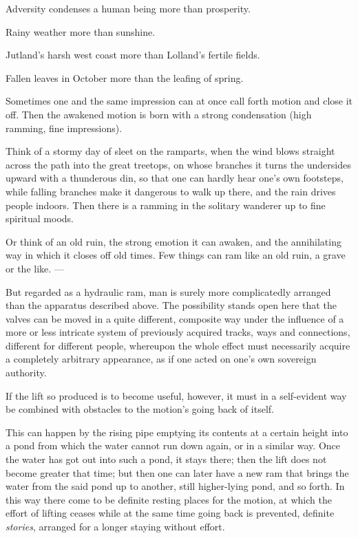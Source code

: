 \documentclass[12pt,a4paper,openany]{book}
\newcommand{\opage}[1]{\marginnote{\footnotesize\textit{[#1]}}}
\begin{document}
Adversity condenses a human being more than prosperity.

Rainy weather more than sunshine.

Jutland's harsh west coast more than Lolland's fertile
fields.

Fallen leaves in October more than the leafing of spring.

Sometimes one and the same impression can at once call forth
motion and close it off. Then the awakened motion is born
with a strong condensation (high ramming, fine impressions).


Think of a stormy day of sleet on the ramparts, when
the wind blows straight across the path into the great treetops, on
whose branches it turns the undersides upward with a thunderous
din, so that one can hardly hear one's own footsteps,
while falling branches make it dangerous to walk up there,
and the rain drives people indoors. Then there is a ramming in the solitary
wanderer up to fine spiritual moods.

Or think of an old ruin, the strong emotion
\setcounter{footnote}{0}%
\opage{293}it can awaken, and the annihilating way in which
it closes off old times. Few things can ram like
an old ruin, a grave or the like. ---

But regarded as a hydraulic ram, man is surely
more complicatedly arranged than the apparatus described above.
The possibility stands open here that the valves can be moved
in a quite different, composite way under the influence
of a more or less intricate system of previously acquired
tracks, ways and connections, different for different
people, whereupon the whole effect must necessarily
acquire a completely arbitrary appearance, as if one
acted on one's own sovereign authority.

If the lift so produced is to become useful, however,
it must in a self-evident way be combined with obstacles
to the motion's going back of itself.

This can happen by the rising pipe emptying its contents at a certain height
into a pond from which the water cannot run
down again, or in a similar way. Once the water has got out into
such a pond, it stays there; then the lift does not become greater
that time; but then one can later have a new ram that
brings the water from the said pond up to another, still
higher-lying pond, and so forth. In this way there come to be definite
resting places for the motion, at which the effort of lifting
ceases while at the same time going back is prevented, definite
\emph{stories}, arranged for a longer staying without
effort.
\end{document}
